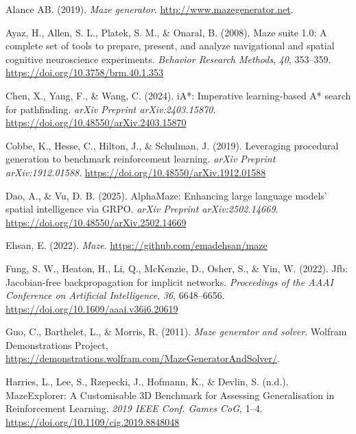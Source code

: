\documentclass[10pt,a4paper,onecolumn]{article}
\newlength{\cslhangindent}
\newenvironment{CSLReferences}[2] %
 {\begin{list}{}{%
  \setlength{\itemindent}{0pt}
  \setlength{\leftmargin}{0pt}
  \setlength{\parsep}{0pt}
  \ifodd #1
   \setlength{\leftmargin}{\cslhangindent}
   \setlength{\itemindent}{-1\cslhangindent}
  \fi
  \setlength{\itemsep}{#2\baselineskip}}}
 {\end{list}}
\begin{document}
\hypertarget{refs}{}
\begin{CSLReferences}{1}{0.5}
\leavevmode{}%
Alance AB. (2019). \emph{Maze generator}.
\url{http://www.mazegenerator.net}.

\leavevmode{}%
Ayaz, H., Allen, S. L., Platek, S. M., \& Onaral, B. (2008). Maze suite
1.0: A complete set of tools to prepare, present, and analyze
navigational and spatial cognitive neuroscience experiments.
\emph{Behavior Research Methods}, \emph{40}, 353--359.
\url{https://doi.org/10.3758/brm.40.1.353}

\leavevmode{}%
Chen, X., Yang, F., \& Wang, C. (2024). {iA*}: Imperative learning-based
{A*} search for pathfinding. \emph{arXiv Preprint arXiv:2403.15870}.
\url{https://doi.org/10.48550/arXiv.2403.15870}

\leavevmode{}%
Cobbe, K., Hesse, C., Hilton, J., \& Schulman, J. (2019). Leveraging
procedural generation to benchmark reinforcement learning. \emph{arXiv
Preprint arXiv:1912.01588}.
\url{https://doi.org/10.48550/arXiv.1912.01588}

\leavevmode{}%
Dao, A., \& Vu, D. B. (2025). AlphaMaze: Enhancing large language
models' spatial intelligence via GRPO. \emph{arXiv Preprint
arXiv:2502.14669}. \url{https://doi.org/10.48550/arXiv.2502.14669}

\leavevmode{}%
Ehsan, E. (2022). \emph{Maze}. \url{https://github.com/emadehsan/maze}

\leavevmode{}%
Fung, S. W., Heaton, H., Li, Q., McKenzie, D., Osher, S., \& Yin, W.
(2022). Jfb: Jacobian-free backpropagation for implicit networks.
\emph{Proceedings of the AAAI Conference on Artificial Intelligence},
\emph{36}, 6648--6656. \url{https://doi.org/10.1609/aaai.v36i6.20619}

\leavevmode{}%
Guo, C., Barthelet, L., \& Morris, R. (2011). \emph{Maze generator and
solver}. Wolfram Demonstrations Project,
\url{https://demonstrations.wolfram.com/MazeGeneratorAndSolver/}.

\leavevmode{}%
Harries, L., Lee, S., Rzepecki, J., Hofmann, K., \& Devlin, S. (n.d.).
{MazeExplorer}: {A Customisable 3D Benchmark} for {Assessing
Generalisation} in {Reinforcement Learning}. \emph{2019 {IEEE Conf}.
{Games CoG}}, 1--4. \url{https://doi.org/10.1109/cig.2019.8848048}


\end{CSLReferences}
\end{document}
